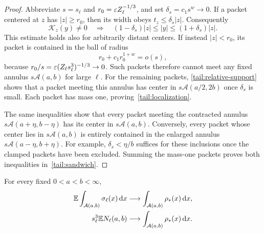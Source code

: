 \begin{proof}
Abbreviate $s=s_\ell$ and $r_0=\varepsilon Z_\ell^{-1/3}$, and set
$\delta_s=c_1s^w\to0$. If a packet centered at $z$ has $|z|\ge r_0$,
then its width obeys $t_z\le\delta_s|z|$. Consequently
\begin{equation}\label{tail:relative-support}
 \mathcal K_z(y)\ne0
 \quad\Longrightarrow\quad
 (1-\delta_s)|z|\le |y|\le(1+\delta_s)|z|.
\end{equation}
This estimate holds also for arbitrarily distant centers. If instead
$|z|<r_0$, its packet is contained in the ball of radius
\[
 r_0+c_1r_0^{1+w}=o(s),
\]
because $r_0/s=\varepsilon(Z_\ell s_\ell^3)^{-1/3}\to0$. Such packets
therefore cannot meet any fixed annulus $s\mathcal A(a,b)$ for large
$\ell$. For the remaining packets, \eqref{tail:relative-support}
shows that a packet meeting this annulus has center in
$s\mathcal A(a/2,2b)$ once $\delta_s$ is small. Each packet has mass
one, proving~\eqref{tail:localization}.

The same inequalities show that every packet meeting the contracted
annulus $s\mathcal A(a+\eta,b-\eta)$ has its center in
$s\mathcal A(a,b)$. Conversely, every packet whose center lies in
$s\mathcal A(a,b)$ is entirely contained in the enlarged annulus
$s\mathcal A(a-\eta,b+\eta)$. For example,
$\delta_s<\eta/b$ suffices for these inclusions once the clamped
packets have been excluded. Summing the mass-one packets proves both
inequalities in~\eqref{tail:sandwich}.
\end{proof}

\begin{lemma}\label{tail:annular}
For every fixed $0<a<b<\infty$,
\begin{align}
 \mathbb E\int_{\mathcal A(a,b)}\sigma_\ell(x)\,\mathrm d x
       &\longrightarrow \int_{\mathcal A(a,b)}\rho_*(x)\,\mathrm d x,
          \label{tail:smoothed-annulus}\\
 s_\ell^3\mathbb E N_\ell(a,b)
       &\longrightarrow \int_{\mathcal A(a,b)}\rho_*(x)\,\mathrm d x.
          \label{tail:raw-annulus}
\end{align}
\end{lemma}

